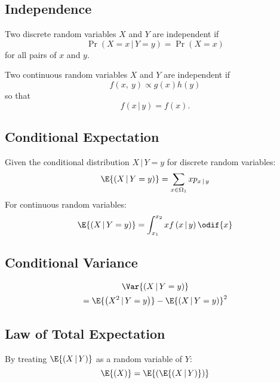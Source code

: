 \documentclass{article}
\begin{document}
\begin{multicols}{3}
    \subsection{Independence}
    Two discrete random variables \(X\) and \(Y\) are independent if
    \begin{equation*}
        \Pr{\left( X = x \,\vert\, Y = y \right)} = \Pr{\left( X = x \right)}
    \end{equation*}
    for all pairs of \(x\) and \(y\).

    Two continuous random variables \(X\) and \(Y\) are independent if
    \begin{equation*}
        f\left( x,\: y \right) \propto g\left( x \right) h\left( y \right)
    \end{equation*}
    so that
    \begin{equation*}
        f\left( x \,\vert\, y \right) = f\left( x \right).
    \end{equation*}
    \subsection{Conditional Expectation}
    Given the conditional distribution \(X \,\vert\, Y = y\) for discrete random variables:
    \begin{equation*}
        \E{\left( X \,\vert\, Y = y \right)} = \sum_{x\in\Omega_1} x p_{x\,\vert\,y}
    \end{equation*}
    For continuous random variables:
    \begin{equation*}
        \E{\left( X \,\vert\, Y = y \right)} = \int_{x_1}^{x_2} x f\left( x \,\vert\, y \right) \odif{x}
    \end{equation*}
    \subsection{Conditional Variance}
    \begin{multline*}
        \Var{\left( X \,\vert\, Y = y \right)} \\
        = \E{\left( X^2 \,\vert\, Y = y \right)} - \E{\left( X \,\vert\, Y = y \right)}^2
    \end{multline*}
    \subsection{Law of Total Expectation}
    By treating \(\E{\left( X \,\vert\, Y \right)}\) as a random variable of \(Y\):
    \begin{equation*}
        \E{\left( X \right)} = \E{\left( \E{\left( X \,\vert\, Y \right)} \right)}
    \end{equation*}

\end{multicols}
\end{document}

